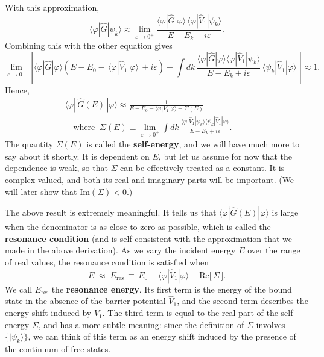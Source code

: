 \documentclass[pra,12pt]{revtex4}
\begin{document}
With this approximation,
$$\langle\varphi|\hat{G}|\psi_k\rangle \approx \lim_{\varepsilon\rightarrow0^+} \frac{\langle\varphi|\hat{G}|\varphi\rangle \, \langle\varphi|\hat{V}_1|\psi_k\rangle}{E-E_k+i\varepsilon}.$$
Combining this with the other equation gives
$$\lim_{\varepsilon\rightarrow0^+} \left[\langle\varphi|\hat{G}|\varphi\rangle \left(E - E_0 -\, \langle\varphi|\hat{V}_1|\varphi\rangle \, + i\varepsilon\right) - \int dk\, \frac{\langle\varphi|\hat{G}|\varphi\rangle\langle\varphi|\hat{V}_1|\psi_k\rangle}{E-E_k+i\varepsilon} \, \langle\psi_k| \hat{V}_1|\varphi\rangle\right] \approx 1.$$
Hence,
$$\boxed{\begin{aligned}\langle\varphi|\,\hat{G}(E)\,|\varphi\rangle \approx \frac{1}{\displaystyle E - E_0 - \langle\varphi|V_1|\varphi\rangle - \Sigma(E)} \qquad \\ \quad \mathrm{where}\;\;\Sigma(E) \equiv \lim_{\varepsilon\rightarrow0^+} \int dk\, \frac{\displaystyle\langle\varphi|\hat{V}_1|\psi_k\rangle \langle\psi_k| \hat{V}_1|\varphi\rangle}{\displaystyle E-E_k+i\varepsilon}. \qquad
\end{aligned}}$$
The quantity $\Sigma(E)$ is called the \textbf{self-energy}, and we
will have much more to say about it shortly.  It is dependent on $E$,
but let us assume for now that the dependence is weak, so that
$\Sigma$ can be effectively treated as a constant.  It is
complex-valued, and both its real and imaginary parts will be
important.  (We will later show that $\mathrm{Im}(\Sigma) < 0$.)

The above result is extremely meaningful.  It tells us that
$\langle\varphi|\hat{G}(E)|\varphi\rangle$ is large when the
denominator is as close to zero as possible, which is called the
\textbf{resonance condition} (and is self-consistent with the
approximation that we made in the above derivation).  As we vary the
incident energy $E$ over the range of real values, the resonance
condition is satisfied when
$$E \;\approx\; E_{\mathrm{res}} \,\equiv\, E_0 + \langle\varphi|\hat{V}_1|\varphi\rangle + \mathrm{Re}\big[\,\Sigma\,\big].$$
We call $E_{\mathrm{res}}$ the \textbf{resonance energy}.  Its first
term is the energy of the bound state in the absence of the barrier
potential $\hat{V}_1$, and the second term describes the energy shift
induced by $\hat{V}_1$.  The third term is equal to the real part of
the self-energy $\Sigma$, and has a more subtle meaning: since the
definition of $\Sigma$ involves $\{|\psi_k\rangle\}$, we can think of
this term as an energy shift induced by the presence of the continuum
of free states.
\end{document}
